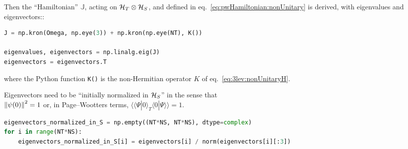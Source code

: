Then the ``Hamiltonian'' ${\mathbb{J}}$, acting on $\mathcal{H}_T \otimes \mathcal{H}_S$, and defined in eq.~\eqref{eq:pwHamiltonian:nonUnitary}
is derived, with eigenvalues and eigenvectors::
\begin{lstlisting}[language=Python]
J = np.kron(Omega, np.eye(3)) + np.kron(np.eye(NT), K())
 
eigenvalues, eigenvectors = np.linalg.eig(J)
eigenvectors = eigenvectors.T
\end{lstlisting}
where the Python function \verb|K()| is the non-Hermitian operator $K$ of eq.~\eqref{eq:3lev:nonUnitaryH}.

Eigenvectors need to be ``initially normalized in $\mathcal{H}_S$'' in the sense that\\
$\norm{\psi(0)}^2=1$ or,
 in Page--Wootters terms, $\langle\langle \Psi | 0 \rangle_{T}\langle 0 | \Psi \rangle \rangle = 1$.
\begin{lstlisting}[language=Python]
eigenvectors_normalized_in_S = np.empty((NT*NS, NT*NS), dtype=complex)
for i in range(NT*NS):
    eigenvectors_normalized_in_S[i] = eigenvectors[i] / norm(eigenvectors[i][:3])
\end{lstlisting}

